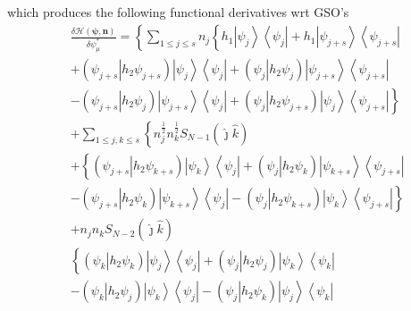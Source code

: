\documentclass[aps,preprint]{revtex4}%
\begin{document}
which produces the following functional derivatives wrt GSO's
\begin{align}
&  \frac{\delta\mathcal{H}\left(  \mathbf{\psi,n}\right)  }{\delta\psi_{\mu
}^{\ast}}=\left\{  \sum_{1\leq j\leq s}n_{j}\left\{  h_{1}\left\vert \psi
_{j}\right\rangle \left\langle \psi_{j}\right\vert +h_{1}\left\vert \psi
_{j+s}\right\rangle \left\langle \psi_{j+s}\right\vert \right.  \right.
\nonumber\\
&  +\left(  \left.  \psi_{j+s}\right\vert h_{2}\psi_{j+s}\right)  \left\vert
\psi_{j}\right\rangle \left\langle \psi_{j}\right\vert +\left(  \left.
\psi_{j}\right\vert h_{2}\psi_{j}\right)  \left\vert \psi_{j+s}\right\rangle
\left\langle \psi_{j+s}\right\vert \nonumber\\
&  -\left.  \left(  \left.  \psi_{j+s}\right\vert h_{2}\psi_{j}\right)
\left\vert \psi_{j+s}\right\rangle \left\langle \psi_{j}\right\vert +\left(
\left.  \psi_{j}\right\vert h_{2}\psi_{j+s}\right)  \left\vert \psi
_{j}\right\rangle \left\langle \psi_{j+s}\right\vert \right\} \nonumber\\
&  +\sum_{1\leq j,k\leq s}\left\{  n_{j}^{\frac{1}{2}}n_{k}^{\frac{1}{2}%
}S_{N-1}\left(  \hat{\jmath}\hat{k}\right)  \right. \nonumber\\
&  +\left\{  \left(  \left.  \psi_{j+s}\right\vert h_{2}\psi_{k+s}\right)
\left\vert \psi_{k}\right\rangle \left\langle \psi_{j}\right\vert +\left(
\left.  \psi_{j}\right\vert h_{2}\psi_{k}\right)  \left\vert \psi
_{k+s}\right\rangle \left\langle \psi_{j+s}\right\vert \right. \nonumber\\
&  -\left.  \left(  \left.  \psi_{j+s}\right\vert h_{2}\psi_{k}\right)
\left\vert \psi_{k+s}\right\rangle \left\langle \psi_{j}\right\vert -\left(
\left.  \psi_{j}\right\vert h_{2}\psi_{k+s}\right)  \left\vert \psi
_{k}\right\rangle \left\langle \psi_{j+s}\right\vert \right\} \nonumber\\
&  +n_{j}n_{k}S_{N-2}\left(  \hat{\jmath}\hat{k}\right) \nonumber\\
&  \left\{  \left(  \left.  \psi_{k}\right\vert h_{2}\psi_{k}\right)
\left\vert \psi_{j}\right\rangle \left\langle \psi_{j}\right\vert +\left(
\left.  \psi_{j}\right\vert h_{2}\psi_{j}\right)  \left\vert \psi
_{k}\right\rangle \left\langle \psi_{k}\right\vert \right. \nonumber\\
&  -\left(  \left.  \psi_{k}\right\vert h_{2}\psi_{j}\right)  \left\vert
\psi_{k}\right\rangle \left\langle \psi_{j}\right\vert -\left(  \left.
\psi_{j}\right\vert h_{2}\psi_{k}\right)  \left\vert \psi_{j}\right\rangle
\left\langle \psi_{k}\right\vert \nonumber\\

\end{align}
\end{document}
